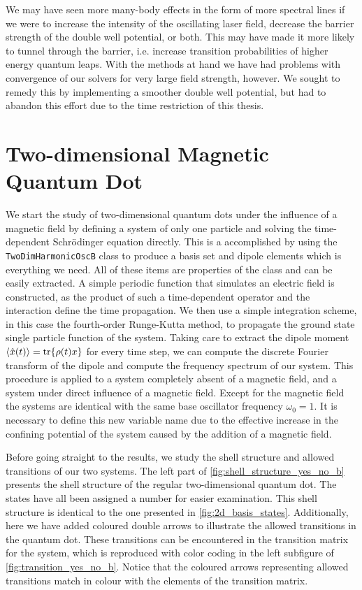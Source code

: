 We may have seen more many-body effects in the form of more spectral lines if we were to increase 
the intensity of the oscillating laser field, decrease the barrier strength of the double well potential,
or both. This may have made it more likely to tunnel through the barrier, i.e. increase transition 
probabilities of higher energy quantum leaps. With the methods at hand we have had problems with 
convergence of our solvers for very large field strength, however. We sought to remedy this by 
implementing a smoother double well potential, but had to abandon this effort due to the time 
restriction of this thesis.


\section{Two-dimensional Magnetic Quantum Dot}

We start the study of two-dimensional quantum dots under the influence of a magnetic 
field by defining a system of only one particle and solving the time-dependent 
Schrödinger equation
directly. This is a accomplished by using the \lstinline{TwoDimHarmonicOscB} class
to produce a basis set and dipole elements
which is everything we need. All of these items are properties of the class and can be
easily extracted. A simple periodic function that simulates an electric field is constructed, as 
the product of such a time-dependent operator and the interaction define the 
time propagation. We then use a simple integration scheme, in this case the fourth-order 
Runge-Kutta method, to propagate the ground state single particle function of the system.
Taking care to extract the dipole moment $\ev{\hat{x}(t)} = \tr{\rho(t) x}$
for every time step, we can compute the discrete Fourier 
transform of the dipole and compute the frequency spectrum of our system. This procedure is 
applied to a system completely absent of a magnetic field, and a system under direct influence 
of a magnetic field. Except for the magnetic field the systems are identical with the 
same base oscillator frequency $\omega_0 = 1$. It is necessary to define this new variable 
name due to the effective increase in the confining potential of the system caused by the 
addition of a magnetic field.

Before going straight to the results, we study the shell structure and allowed transitions of 
our two systems. The left part of \autoref{fig:shell_structure_yes_no_b} presents the 
shell structure of the regular two-dimensional quantum dot. The states have all been assigned
a number for easier examination. This shell structure is 
identical to the one presented in \autoref{fig:2d_basis_states}. Additionally, here we have added
coloured double arrows to illustrate the allowed transitions in the quantum dot. These 
transitions can be encountered in the transition matrix for the system, which is
reproduced with color coding in the left subfigure of
\autoref{fig:transition_yes_no_b}. Notice that the coloured 
arrows representing allowed transitions match in colour with the elements of the transition 
matrix.


